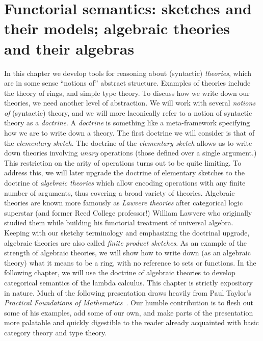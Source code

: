 \documentclass[12pt,twoside]{reedthesis}
\theoremstyle{definition}
\theoremstyle{remark}
\theoremstyle{plain}
\begin{document}
\chapter{Functorial semantics: sketches and their models; algebraic theories and their algebras}
In this chapter we develop tools for reasoning about (syntactic)
\emph{theories}, which are in some sense ``notions of'' abstract structure.
Examples of theories include the theory of rings, and simple type theory. To
discuss how we write down our theories, we need another level of abstraction. We
will work with several \emph{notions of} (syntactic) theory, and we will more
laconically refer to a notion of syntactic theory as a \emph{doctrine}. A
\emph{doctrine} is something like a meta-framework specifying how we are to
write down a theory. The first doctrine we will consider is that of the
\emph{elementary sketch}. %
The doctrine of the \emph{elementary sketch} allows us to write down theories
involving \emph{unary} operations (those defined over a single argument.) This
restriction on the arity of operations turns out to be quite limiting. To
address this, we will later upgrade the doctrine of elementary sketches to the
doctrine of \emph{algebraic theories} which allow encoding operations with any
finite number of arguments, thus covering a broad variety of theories. Algebraic
theories are known more famously as \emph{Lawvere theories} after categorical
logic superstar (and former Reed College professor!) William Lawvere who
originally studied them while building his functorial treatment of universal
algebra. Keeping with our sketchy terminology and emphasizing the doctrinal
upgrade, algebraic theories are also called \emph{finite product sketches}. As
an example of the strength of algebraic theories, we will show how to write down
(as an algebraic theory) what it means to be a ring, with no reference to sets
or functions. In the following chapter, we will use the doctrine of algebraic
theories to develop categorical semantics of the lambda calculus. This chapter
is strictly expository in nature. Much of the following presentation draws
heavily from Paul Taylor's \emph{Practical Foundations of
  Mathematics}~\cite{taylor_practical_1999}. Our humble contribution is to flesh
out some of his examples, add some of our own, and make parts of the
presentation more palatable and quickly digestible to the reader already
acquainted with basic category theory and type theory.
\end{document}
